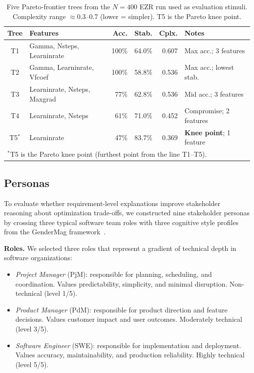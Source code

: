 \documentclass[sigconf,review]{acmart}
\begin{document}
\begin{table}[ht]
  \caption{Five Pareto-frontier trees from the $N=400$ EZR run used as
           evaluation stimuli. Complexity range $\approx$0.3--0.7 (lower
           = simpler). T5 is the Pareto knee point.}
  \label{tab:pareto}
  \footnotesize
  \begin{tabular}{clrrrp{1.6cm}}
    \toprule
    \textbf{Tree} & \textbf{Features} & \textbf{Acc.} &
    \textbf{Stab.} & \textbf{Cplx.} & \textbf{Notes} \\
    \midrule
    T1       & Gamma, Nsteps, Learninrate   & 100\% & 64.0\% & 0.607 & Max acc.; 3 features \\
    T2       & Gamma, Learninrate, Vfcoef   & 100\% & 58.8\% & 0.536 & Max acc.; lowest stab. \\
    T3       & Learninrate, Nsteps, Maxgrad &  77\% & 62.8\% & 0.536 & Mid acc.; 3 features \\
    T4       & Learninrate, Nsteps          &  61\% & 71.0\% & 0.452 & Compromise; 2 features \\
    T5$^{*}$ & Learninrate                  &  47\% & 83.7\% & 0.369 & \textbf{Knee point}; 1 feature \\
    \bottomrule
    \multicolumn{6}{l}{$^{*}$T5 is the Pareto knee point (furthest point from the line T1--T5).}
  \end{tabular}
\end{table}

\subsection{Personas}
\label{sec:personas}

To evaluate whether requirement-level explanations improve 
stakeholder reasoning about optimization trade-offs, we constructed 
nine stakeholder personas by crossing three typical software team 
roles with three cognitive style profiles from the GenderMag 
framework~\cite{burnett2016gendermag}.

\textbf{Roles.} We selected three roles that represent a gradient 
of technical depth in software organizations:

\begin{itemize}
    \item \textit{Project Manager} (PjM): responsible for planning, 
    scheduling, and coordination. Values predictability, simplicity, 
    and minimal disruption. Non-technical (level 1/5).
    \item \textit{Product Manager} (PdM): responsible for product 
    direction and feature decisions. Values customer impact and user 
    outcomes. Moderately technical (level 3/5).
    \item \textit{Software Engineer} (SWE): responsible for 
    implementation and deployment. Values accuracy, maintainability, 
    and production reliability. Highly technical (level 5/5).
\end{itemize}
\end{document}

